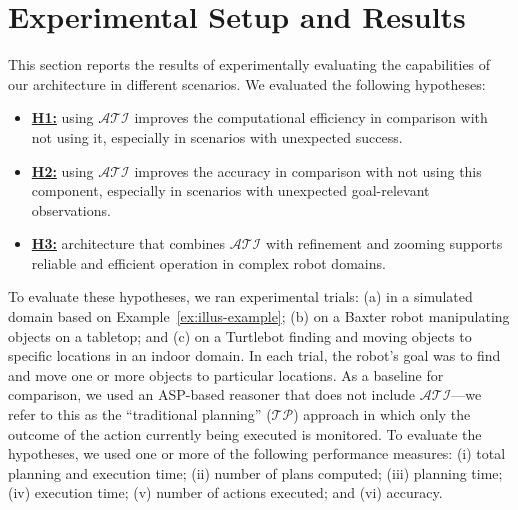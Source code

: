\documentclass[letterpaper, 10 pt, conference]{ieeeconf}  %
\begin{document}
\section{Experimental Setup and Results}
\label{sec:expres}
This section reports the results of experimentally evaluating the
capabilities of our architecture in different scenarios.  We evaluated
the following hypotheses:
\begin{itemize}
\item \underline{\textbf{H1:}} using $\mathcal{ATI}$ improves the
  computational efficiency in comparison with not using it, especially
  in scenarios with unexpected success.
\item \underline{\textbf{H2:}} using $\mathcal{ATI}$ improves the
  accuracy in comparison with not using this component, especially in
  scenarios with unexpected goal-relevant observations.
\item \underline{\textbf{H3:}} architecture that combines
  $\mathcal{ATI}$ with refinement and zooming supports reliable and
  efficient operation in complex robot domains.
\end{itemize}
To evaluate these hypotheses, we ran experimental trials: (a) in a
simulated domain based on Example~\ref{ex:illus-example}; (b) on a
Baxter robot manipulating objects on a tabletop; and (c) on a
Turtlebot finding and moving objects to specific locations in an
indoor domain. In each trial, the robot's goal was to find and move
one or more objects to particular locations. As a baseline for
comparison, we used an ASP-based reasoner that does not include
$\mathcal{ATI}$---we refer to this as the ``traditional planning''
($\mathcal{TP}$) approach in which only the outcome of the action
currently being executed is monitored. To evaluate the hypotheses, we
used one or more of the following performance measures: (i) total
planning and execution time; (ii) number of plans computed; (iii)
planning time; (iv) execution time; (v) number of actions executed;
and (vi) accuracy.
\end{document}
